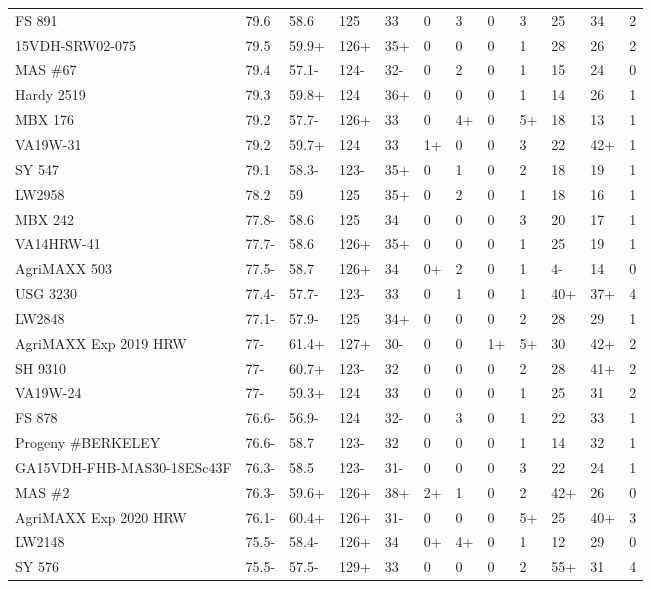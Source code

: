 \documentclass[12pt, letterpaper]{article}
\begin{document}
\begin{landscape}
\begin{ThreePartTable}
\begin{longtable}{llllllllllll}
  FS 891 & 79.6 & 58.6 & 125 & 33 & 0 & 3 & 0 & 3 & 25 & 34 & 2 \\ 
  15VDH-SRW02-075 & 79.5 & 59.9+ & 126+ & 35+ & 0 & 0 & 0 & 1 & 28 & 26 & 2 \\ 
  MAS \#67 & 79.4 & 57.1- & 124- & 32- & 0 & 2 & 0 & 1 & 15 & 24 & 0 \\ 
  Hardy 2519 & 79.3 & 59.8+ & 124 & 36+ & 0 & 0 & 0 & 1 & 14 & 26 & 1 \\ 
  MBX 176 & 79.2 & 57.7- & 126+ & 33 & 0 & 4+ & 0 & 5+ & 18 & 13 & 1 \\ 
  VA19W-31 & 79.2 & 59.7+ & 124 & 33 & 1+ & 0 & 0 & 3 & 22 & 42+ & 1 \\ 
  SY 547 & 79.1 & 58.3- & 123- & 35+ & 0 & 1 & 0 & 2 & 18 & 19 & 1 \\ 
  LW2958 & 78.2 & 59 & 125 & 35+ & 0 & 2 & 0 & 1 & 18 & 16 & 1 \\ 
  MBX 242 & 77.8- & 58.6 & 125 & 34 & 0 & 0 & 0 & 3 & 20 & 17 & 1 \\ 
  VA14HRW-41 & 77.7- & 58.6 & 126+ & 35+ & 0 & 0 & 0 & 1 & 25 & 19 & 1 \\ 
  AgriMAXX 503 & 77.5- & 58.7 & 126+ & 34 & 0+ & 2 & 0 & 1 & 4- & 14 & 0 \\ 
  USG 3230 & 77.4- & 57.7- & 123- & 33 & 0 & 1 & 0 & 1 & 40+ & 37+ & 4 \\ 
  LW2848 & 77.1- & 57.9- & 125 & 34+ & 0 & 0 & 0 & 2 & 28 & 29 & 1 \\ 
  AgriMAXX Exp 2019 HRW & 77- & 61.4+ & 127+ & 30- & 0 & 0 & 1+ & 5+ & 30 & 42+ & 2 \\ 
  SH 9310 & 77- & 60.7+ & 123- & 32 & 0 & 0 & 0 & 2 & 28 & 41+ & 2 \\ 
  VA19W-24 & 77- & 59.3+ & 124 & 33 & 0 & 0 & 0 & 1 & 25 & 31 & 2 \\ 
  FS 878 & 76.6- & 56.9- & 124 & 32- & 0 & 3 & 0 & 1 & 22 & 33 & 1 \\ 
  Progeny \#BERKELEY & 76.6- & 58.7 & 123- & 32 & 0 & 0 & 0 & 1 & 14 & 32 & 1 \\ 
  GA15VDH-FHB-MAS30-18ESc43F & 76.3- & 58.5 & 123- & 31- & 0 & 0 & 0 & 3 & 22 & 24 & 1 \\ 
  MAS \#2 & 76.3- & 59.6+ & 126+ & 38+ & 2+ & 1 & 0 & 2 & 42+ & 26 & 0 \\ 
  AgriMAXX Exp 2020 HRW & 76.1- & 60.4+ & 126+ & 31- & 0 & 0 & 0 & 5+ & 25 & 40+ & 3 \\ 
  LW2148 & 75.5- & 58.4- & 126+ & 34 & 0+ & 4+ & 0 & 1 & 12 & 29 & 0 \\ 
  SY 576 & 75.5- & 57.5- & 129+ & 33 & 0 & 0 & 0 & 2 & 55+ & 31 & 4 \\ 

\end{longtable}
\end{ThreePartTable}
\end{landscape}
\end{document}
